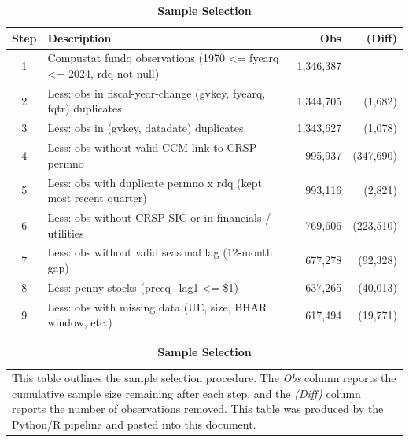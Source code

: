 \documentclass[english,authoryear,IEEEtran,12pt]{article}
\begin{document}
\begin{table}[htbp]\centering\footnotesize{
\renewcommand{\arraystretch}{1.5}
\caption{\textbf{Sample Selection} \label{tab:sample-selection}}

\begin{tabular}[t]{clrr}
\toprule
Step & Description & Obs & (Diff)\\
\midrule
1 & Compustat fundq observations (1970 <= fyearq <= 2024, rdq not null) & 1,346,387 & \\
2 & Less: obs in fiscal-year-change (gvkey, fyearq, fqtr) duplicates & 1,344,705 & (1,682)\\
3 & Less: obs in (gvkey, datadate) duplicates & 1,343,627 & (1,078)\\
4 & Less: obs without valid CCM link to CRSP permno & 995,937 & (347,690)\\
5 & Less: obs with duplicate permno x rdq (kept most recent quarter) & 993,116 & (2,821)\\
6 & Less: obs without CRSP SIC or in financials / utilities & 769,606 & (223,510)\\
7 & Less: obs without valid seasonal lag (12-month gap) & 677,278 & (92,328)\\
8 & Less: penny stocks (prccq\_lag1 <= \$1) & 637,265 & (40,013)\\
9 & Less: obs with missing data (UE, size, BHAR window, etc.) & 617,494 & (19,771)\\
\bottomrule
\end{tabular}

\vspace{-1.5\baselineskip}
\singlespace
\flushleft
\begin{tabular}{@{}p{\linewidth}@{}}
\footnotesize
This table outlines the sample selection procedure. The \textit{Obs} column reports the cumulative sample size remaining after each step, and the \textit{(Diff)} column reports the number of observations removed. This table was produced by the Python/R pipeline and pasted into this document.
\end{tabular}
}
\end{table}


\clearpage\newpage

\end{document}
